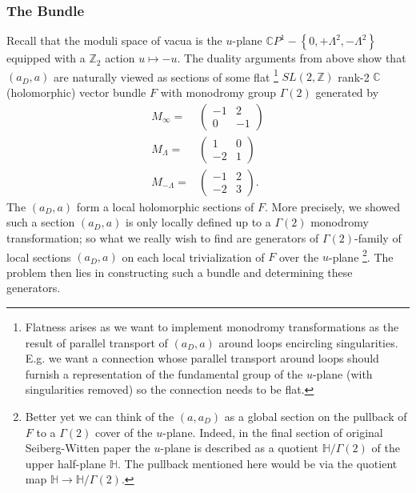 \documentclass[12pt, onecolumn]{article}
\begin{document}
\subsubsection{The Bundle}
Recall that the moduli space of vacua is the $u$-plane $\mathbb{C}P^1-\left\{0,+\Lambda^2,-\Lambda^2\right\}$ equipped with a $\mathbb{Z}_{2}$ action $u \mapsto -u$.  The duality arguments from above show that $(a_{D},a)$ are naturally viewed as sections of some flat \footnote{Flatness arises as we want to implement monodromy transformations as the result of parallel transport of $(a_{D},a)$ around loops encircling singularities.  E.g. we want a connection whose parallel transport around loops should furnish a representation of the fundamental group of the $u$-plane (with singularities removed) so the connection needs to be flat.} $SL(2,\mathbb{Z})$ rank-2 $\mathbb{C}$ (holomorphic) vector bundle $F$ with monodromy group $\Gamma(2)$ generated by
\begin{align*}
M_{\infty}=&
\left(
\begin{array}{cc}
-1 & 2\\
0 & -1
\end{array}
\right)\\
M_{\Lambda}=&
\left(
\begin{array}{cc}
1 & 0\\
-2 & 1
\end{array}
\right)\\
M_{-\Lambda}=&
\left(
\begin{array}{cc}
-1 & 2\\
-2 & 3
\end{array}
\right).
\end{align*}
The $(a_{D},a)$ form a local holomorphic sections of $F$.  More precisely, we showed such a section $(a_{D},a)$ is only locally defined up to a $\Gamma(2)$ monodromy transformation; so what we really wish to find are generators of $\Gamma(2)$-family of local sections $(a_{D},a)$ on each local trivialization of $F$ over the $u$-plane \footnote{Better yet we can think of the $(a,a_{D})$ as a global section on the pullback of $F$ to a $\Gamma(2)$ cover of the $u$-plane.  Indeed, in the final section of original Seiberg-Witten paper the $u$-plane is described as a quotient $\mathbb{H}/\Gamma(2)$ of the upper half-plane $\mathbb{H}$.  The pullback mentioned here would be via the quotient map $\mathbb{H} \rightarrow \mathbb{H}/\Gamma(2)$.}.   The problem then lies in constructing such a bundle and determining these generators.
\end{document}

